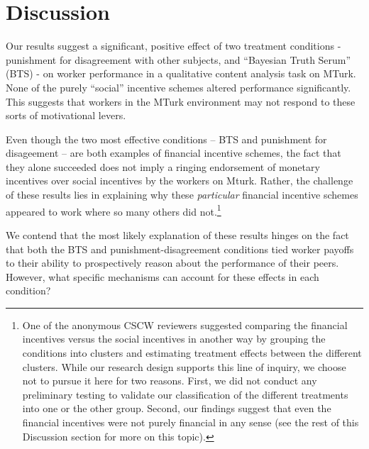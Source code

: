 \documentclass{cscw2010}
\begin{document}
\section{Discussion}

Our results suggest a significant, positive effect of two treatment
conditions - punishment for disagreement with other subjects, and
``Bayesian Truth Serum'' (BTS) - on worker performance in a qualitative
content analysis task on MTurk. None of the purely ``social'' incentive
schemes altered performance significantly. This suggests that workers
in the MTurk environment may not respond to these sorts of
motivational levers.

Even though the two most effective conditions -- BTS
and punishment for disageement -- are both examples of financial incentive
schemes, the fact that they alone succeeded does not imply a ringing
endorsement of monetary incentives over social incentives by the
workers on Mturk. Rather, the challenge of these results lies in
explaining why these \emph{particular} financial incentive schemes
appeared to work where so many others did not.\footnote{One of the
  anonymous CSCW reviewers suggested comparing the financial
  incentives versus the social incentives in another way by grouping
  the conditions into clusters and estimating treatment effects
  between the different clusters. While our research design supports
  this line of inquiry, we choose not to pursue it here for two
  reasons. First, we did not conduct any preliminary testing to
  validate our classification of the different treatments into one or
  the other group. Second, our findings suggest that even the
  financial incentives were not purely financial in any sense (see the
  rest of this Discussion section for more on this topic).}

We contend that the most likely explanation of these results hinges on
the fact that both the BTS and punishment-disagreement conditions tied
worker payoffs to their ability to prospectively reason about the
performance of their peers. However, what specific mechanisms can
account for these effects in each condition?
\end{document}
